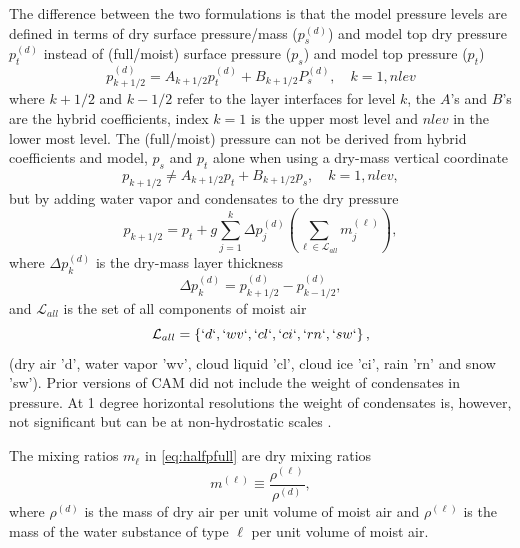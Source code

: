 \documentclass[draft]{agujournal2019}
\begin{document}
The difference between the two formulations is that the model pressure levels are defined in terms of dry surface pressure/mass ($p_s^{(d)}$) and model top dry pressure $p^{(d)}_t$ instead of (full/moist) surface pressure ($p_s$) and model top pressure ($p_t$)
\begin{equation}
p^{(d)}_{k+1/2}=A_{k+1/2}p^{(d)}_t+B_{k+1/2}P_s^{(d)},\quad k=1,nlev\label{eq:ABs}
\end{equation}
where $k+1/2$ and $k-1/2$ refer to the layer interfaces for level $k$, the $A$'s and $B$'s are the hybrid coefficients, index $k=1$ is the upper most level and $nlev$ in the lower most level. The (full/moist) pressure can not be derived from hybrid coefficients and model, $p_s$ and $p_t$ alone when using a dry-mass vertical coordinate
\begin{equation}
p_{k+1/2}\neq A_{k+1/2}p_t+B_{k+1/2}p_s,\quad k=1,nlev,
\end{equation}
but by adding water vapor and condensates to the dry pressure
\begin{equation}
p_{k+1/2}=p_t+g\sum_{j=1}^{k}\Delta p^{(d)}_j \left(\sum_{\ell \in \mathcal{L}_{all}} m_j^{(\ell)}\right),\label{eq:halfpfull}
\end{equation}
where $\Delta p^{(d)}_k$ is the dry-mass layer thickness
\begin{equation*}
  \Delta p^{(d)}_k=p^{(d)}_{k+1/2}-p^{(d)}_{k-1/2},
\end{equation*}
and $\mathcal{L}_{all}$ is the set of all components of moist air
\begin{equation}
\mathcal{L}_{all}=\left\{ `d`,`wv`,`cl`,`ci`,`rn`,`sw`\right\},
\end{equation}
(dry air 'd', water vapor 'wv', cloud liquid 'cl', cloud ice 'ci', rain 'rn' and snow 'sw'). Prior versions of CAM did not include the weight of condensates in pressure. At 1 degree horizontal resolutions the weight of condensates is, however, not significant but can be at non-hydrostatic scales \cite{BLDT2012GRL}.

The mixing ratios $m_\ell$ in \eqref{eq:halfpfull} are 
 dry mixing ratios
\begin{equation}
m^{(\ell)}\equiv \frac{\rho^{(\ell)}}{\rho^{(d)}},\label{eq:mx}
\end{equation}
where $\rho^{(d)}$ is the mass of dry air per unit volume of moist air and $\rho^{(\ell)}$ is the mass of the water substance of type $\ell$ per unit volume of moist air.
\end{document}
